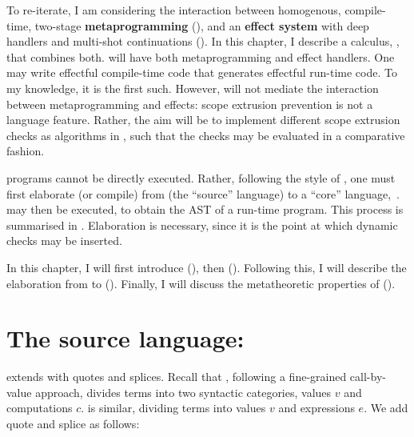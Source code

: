 To re-iterate, I am considering the interaction between homogenous, compile-time, two-stage \textbf{metaprogramming} (), and an \textbf{effect system} with deep handlers and multi-shot continuations (). In this chapter, I describe a calculus, \calculusName{}, that combines both. \calculusName{} will have both metaprogramming and effect handlers. One may write effectful compile-time code that generates effectful run-time code. To my knowledge, it is the first such. However, \calculusName{} will not mediate the interaction between metaprogramming and effects: scope extrusion prevention is not a language feature. Rather, the aim will be to implement different scope extrusion checks as algorithms in \calculusName{}, such that the checks may be evaluated in a comparative fashion. 

\calculusName{} programs cannot be directly executed. Rather, following the style of \citet{xie-2023}, one must first elaborate (or compile) from \calculusName{} (the ``source'' language) to a ``core'' language,\, \coreLang{}.\, \coreLang{} may then be executed, to obtain the AST of a run-time program. This process is summarised in . Elaboration is necessary, since it is the point at which dynamic checks may be inserted. 

In this chapter, I will first introduce \sourceLang{} (), then \coreLang{} (). Following this, I will describe the elaboration from \sourceLang{} to \coreLang{} (). Finally, I will discuss the metatheoretic properties of \calculusName{} (). 

\section{The source language: \texorpdfstring{\sourceLang{}}{Lambda-Op-Quote-Splice}}\label{section:source-lang}
\sourceLang{} extends \efflang{} with quotes and splices. Recall that \efflang{}, following a fine-grained call-by-value approach, divides terms into two syntactic categories, values $v$ and computations $c$. \sourceLang{} is similar, dividing terms into values $v$ and expressions $e$. We add quote and splice as follows:


